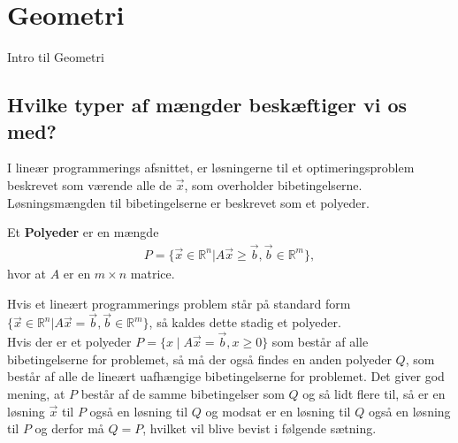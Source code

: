 \chapter{Geometri}
Intro til Geometri
\section{Hvilke typer af mængder beskæftiger vi os med?}
I lineær programmerings afsnittet, er løsningerne til et optimeringsproblem beskrevet som værende alle de $\vec{x}$, som overholder bibetingelserne. Løsningsmængden til bibetingelserne er beskrevet som et polyeder.
\begin{defn} [Polyeder]
Et \textbf{Polyeder} er en mængde 
\begin{align*}
 P =\{ \vec{x} \in \mathds{R}^n | A \vec{x} \geq \vec{b}, \vec{b}\in \mathds{R}^m\},
\end{align*}
hvor at $A$ er en $m \times n$ matrice.
\end{defn}
Hvis et lineært programmerings problem står på standard form $\{ \vec{x} \in \mathds{R}^n | A \vec{x} = \vec{b}, \vec{b}\in \mathds{R}^m\}$, så kaldes dette stadig et polyeder.\\

Hvis der er et polyeder $P=\{x\mid A\vec{x}=\vec{b},x\geq 0\}$ som består af alle bibetingelserne for problemet, så må der også findes en anden polyeder $Q$, som består af alle de lineært uafhængige bibetingelserne for problemet. Det giver god mening, at $P$ består af de samme bibetingelser som $Q$ og så lidt flere til, så er en løsning $\vec{x}$ til $P$ også en løsning til $Q$ og modsat er en løsning til $Q$ også en løsning til $P$ og derfor må $Q=P$, hvilket vil blive bevist i følgende sætning.

